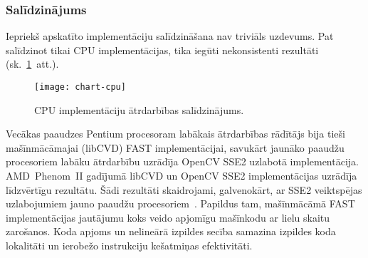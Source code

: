 \subsubsection{Salīdzinājums} \label{sec:fast-compare}
Iepriekš apskatīto implementāciju salīdzināšana nav triviāls uzdevums.
Pat salīdzinot tikai CPU implementācijas, tika iegūti nekonsistenti
rezultāti (sk.~\ref{fig:test1-data-txt}~att.).
\begin{figure}[tbh]
	\centering
	\texttt{[image: chart-cpu]}
	\caption{CPU implementāciju ātrdarbības salīdzinājums.}
	\label{fig:test1-data-txt}
\end{figure}
Vecākas paaudzes Pentium procesoram labākais ātrdarbības rādītājs bija tieši
mašīnmācāmajai (libCVD) FAST implementācijai, savukārt jaunāko paaudžu
procesoriem labāku ātrdarbību uzrādīja OpenCV SSE2 uzlabotā implementācija.
AMD~Phenom~II gadījumā libCVD un OpenCV SSE2 implementācijas uzrādīja
līdzvērtīgu rezultātu.
Šādi rezultāti skaidrojami, galvenokārt, ar SSE2 veiktspējas uzlabojumiem
jauno paaudžu procesoriem~\cite{Core2}. Papildus tam, mašīnmācāmā FAST
implementācijas jautājumu koks veido apjomīgu mašīnkodu ar lielu skaitu
zarošanos. Koda apjoms un nelineārā izpildes secība samazina izpildes koda
lokalitāti un ierobežo instrukciju kešatmiņas efektivitāti.

